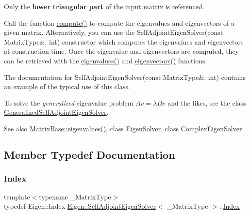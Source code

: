 Only the {\bfseries{lower}} {\bfseries{triangular}} {\bfseries{part}} of the input matrix is referenced.

Call the function \mbox{\hyperlink{class_eigen_1_1_self_adjoint_eigen_solver_a88bcdc24112efa7c4d2ebb3476efcbe9}{compute()}} to compute the eigenvalues and eigenvectors of a given matrix. Alternatively, you can use the Self\+Adjoint\+Eigen\+Solver(const Matrix\+Type\&, int) constructor which computes the eigenvalues and eigenvectors at construction time. Once the eigenvalue and eigenvectors are computed, they can be retrieved with the \mbox{\hyperlink{class_eigen_1_1_self_adjoint_eigen_solver_a8efab27e82aa6aa0ae0c64739238c2e0}{eigenvalues()}} and \mbox{\hyperlink{class_eigen_1_1_self_adjoint_eigen_solver_a7b9f7e641fa46ac4c5f2371405c69b2b}{eigenvectors()}} functions.

The documentation for Self\+Adjoint\+Eigen\+Solver(const Matrix\+Type\&, int) contains an example of the typical use of this class.

To solve the {\itshape generalized} eigenvalue problem $ Av = \lambda Bv $ and the likes, see the class \mbox{\hyperlink{class_eigen_1_1_generalized_self_adjoint_eigen_solver}{Generalized\+Self\+Adjoint\+Eigen\+Solver}}.

\begin{DoxySeeAlso}{See also}
\mbox{\hyperlink{class_eigen_1_1_matrix_base_a30430fa3d5b4e74d312fd4f502ac984d}{Matrix\+Base\+::eigenvalues()}}, class \mbox{\hyperlink{class_eigen_1_1_eigen_solver}{Eigen\+Solver}}, class \mbox{\hyperlink{class_eigen_1_1_complex_eigen_solver}{Complex\+Eigen\+Solver}} 
\end{DoxySeeAlso}


\subsection{Member Typedef Documentation}
\mbox{\label{class_eigen_1_1_self_adjoint_eigen_solver_a8a59ab7734b6eae2754fd78bc7c3a360}} 
\subsubsection{\texorpdfstring{Index}{Index}}
{\footnotesize\ttfamily template$<$typename \+\_\+\+Matrix\+Type$>$ \\
typedef Eigen\+::\+Index \mbox{\hyperlink{class_eigen_1_1_self_adjoint_eigen_solver}{Eigen\+::\+Self\+Adjoint\+Eigen\+Solver}}$<$ \+\_\+\+Matrix\+Type $>$\+::\mbox{\hyperlink{class_eigen_1_1_self_adjoint_eigen_solver_a8a59ab7734b6eae2754fd78bc7c3a360}{Index}}}

